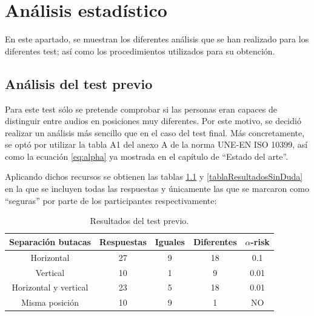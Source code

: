 \documentclass[11pt,a4paper,twoside]{book}
\author{Víctor de Tejada Molera}
\begin{document}
\chapter{Análisis estadístico}    
    
    En este apartado, se muestran los diferentes análisis que se han realizado para los diferentes test; así como los procedimientos utilizados para su obtención.
        
    \section{Análisis del test previo}
        Para este test sólo se pretende comprobar si las personas eran capaces de distinguir entre audios en posiciones muy diferentes. Por este motivo, se decidió realizar un análisis más sencillo que en el caso del test final. Más concretamente, se optó por utilizar la tabla A1 del anexo A de la norma UNE-EN ISO 10399, así como la ecuación \ref{eq:alpha} ya mostrada en el capítulo de ``Estado del arte''.
            
        Aplicando dichos recursos se obtienen las tablas \ref{tablaResultadosDuda} y \ref{tablaResultadosSinDuda} en la que se incluyen todas las respuestas y únicamente las que se marcaron como ``seguras'' por parte de los participantes respectivamente:
            
        \begin{table}[H]
	    \begin{center}
		\begin{scriptsize}
		\begin{tabular}{| c | c | c | c || c |}
			\hline
			\textbf{Separación butacas}&\textbf{Respuestas}&\textbf{Iguales}&\textbf{Diferentes}&\textbf{$\alpha$-risk}\\ \hline
            Horizontal&27&9&18&0.1\\ \hline
            Vertical&10&1&9&0.01\\ \hline
            Horizontal y vertical&23
            &5&18&0.01\\ \hline
            Misma posición&10&9&1&NO\\ \hline
		\end{tabular}
		\caption{Resultados del test previo.}
		\label{tablaResultadosDuda}
		\end{scriptsize}
		\end{center}	
		\end{table}	
		
\end{document}

